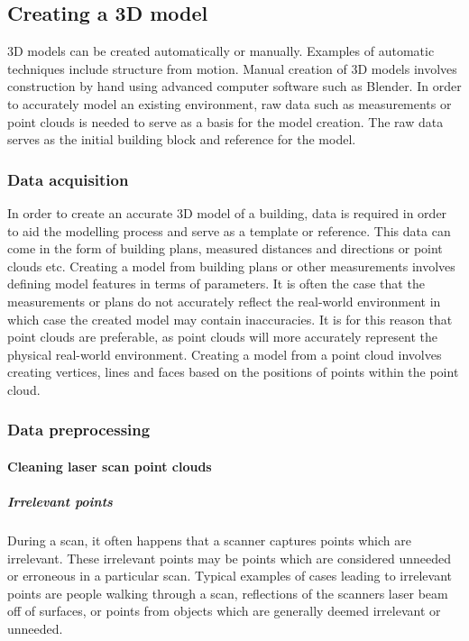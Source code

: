 \documentclass[11pt,a4paper]{report}
\begin{document}
		\subsection{Creating a 3D model}
			3D models can be created automatically or manually. Examples of automatic techniques include structure from motion. Manual creation of 3D models involves construction by hand using advanced computer software such as Blender. 
			In order to accurately model an existing environment, raw data such as measurements or point clouds is needed to serve as a basis for the model creation. The raw data serves as the initial building block and reference for the model.
		
			\subsubsection{Data acquisition}
				In order to create an accurate 3D model of a building, data is required in order to aid the modelling process and serve as a template or reference.
				This data can come in the form of building plans, measured distances and directions or point clouds etc.
				Creating a model from building plans or other measurements involves defining model features in terms of parameters.
				It is often the case that the measurements or plans do not accurately reflect the real-world environment in which case the created model may contain inaccuracies. It is for this reason that point clouds are preferable, as point clouds will more accurately represent the physical real-world environment.
				Creating a model from a point cloud involves creating vertices, lines and faces based on the positions of points  within the point cloud.
				
			\subsubsection{Data preprocessing}
				\paragraph{Cleaning laser scan point clouds}
					\subparagraph{Irrelevant points}
						During a scan, it often happens that a scanner captures points which are irrelevant. These irrelevant points may be points which are considered unneeded or erroneous in a particular scan. Typical examples of cases leading to irrelevant points are people walking through a scan, reflections of the scanners laser beam off of surfaces, or points from objects which are generally deemed irrelevant or unneeded.
						
\end{document}
